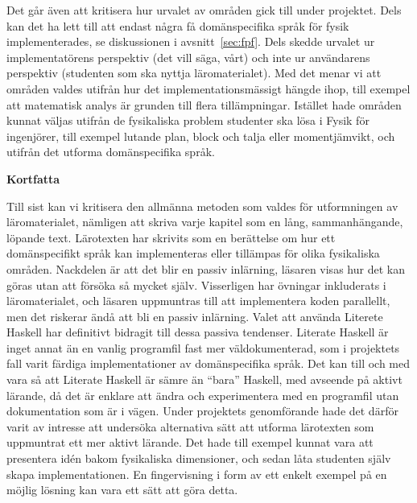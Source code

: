 Det går även att kritisera hur urvalet av områden gick till under projektet.
Dels kan det ha lett till att endast några få domänspecifika språk för fysik
implementerades, se diskussionen i avsnitt~\ref{sec:fpf}. Dels skedde urvalet ur
implementatörens perspektiv (det vill säga, vårt) och inte ur användarens
perspektiv (studenten som ska nyttja läromaterialet). Med det menar vi att
områden valdes utifrån hur det implementationsmässigt hängde ihop, till exempel
att matematisk analys är grunden till flera tillämpningar. Istället hade områden
kunnat väljas utifrån de fysikaliska problem studenter ska lösa i Fysik för
ingenjörer, till exempel lutande plan, block och talja eller momentjämvikt, och
utifrån det utforma domänspecifika språk.

\textbf{Kortfatta}

Till sist kan vi kritisera den allmänna metoden som valdes för utformningen av
läromaterialet, nämligen att skriva varje kapitel som en lång, sammanhängande,
löpande text. Lärotexten har skrivits som en berättelse om hur ett
domänspecifikt språk kan implementeras eller tillämpas för olika fysikaliska
områden. Nackdelen är att det blir en passiv inlärning, läsaren visas hur det kan göras utan att försöka så mycket själv. Visserligen har övningar inkluderats
i läromaterialet, och läsaren uppmuntras till att implementera koden parallellt, men det
riskerar ändå att bli en passiv inlärning. Valet att använda Literete
Haskell har definitivt bidragit till dessa passiva tendenser. Literate Haskell är
inget annat än en vanlig programfil fast mer väldokumenterad, som i projektets fall varit färdiga implementationer av domänspecifika språk. Det kan till och med vara så att Literate
Haskell är sämre än ``bara'' Haskell, med avseende på aktivt lärande, då det är
enklare att ändra och experimentera med en programfil utan dokumentation som är i vägen. Under
projektets genomförande hade det därför varit av intresse att undersöka
alternativa sätt att utforma lärotexten som uppmuntrat ett mer aktivt lärande.
Det hade till exempel kunnat vara att presentera idén bakom fysikaliska
dimensioner, och sedan låta studenten själv skapa implementationen. En fingervisning i form av ett enkelt exempel på en möjlig lösning kan vara ett sätt att göra detta.

